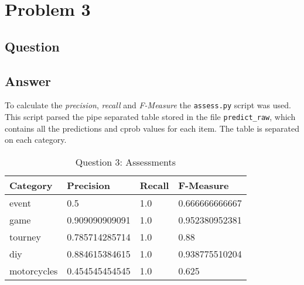\section{Problem 3}

\subsection{Question}


\subsection{Answer}
To calculate the {\it precision}, {\it recall} and {\it F-Measure} the {\tt assess.py} script was used. This script parsed the pipe separated table stored in the file {\tt predict\_raw}, which contains all the predictions and cprob values for each item. The table is separated on each category.



\begin{table}[h!]
\centering
\begin{tabular}{| l | l | l | l |}
\hline
Category & Precision & Recall & F-Measure \\
\hline
event & 0.5 & 1.0 & 0.666666666667 \\
game & 0.909090909091 & 1.0 & 0.952380952381 \\
tourney & 0.785714285714 & 1.0 & 0.88 \\
diy & 0.884615384615 & 1.0 & 0.938775510204 \\
motorcycles & 0.454545454545 & 1.0 & 0.625 \\
\hline
\end{tabular}
\caption{Question 3: Assessments }
\label{tab:assess}
\end{table}
